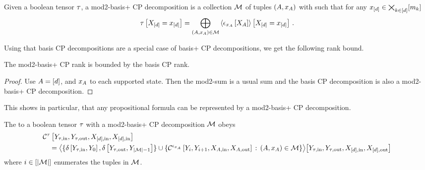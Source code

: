 \begin{definition}
    Given a boolean tensor $\tau$, a mod2-basis+ CP decomposition is a collection $\mathcal{M}$ of tuples $(A,x_{A})$ with such that for any $x_{[d]}\in\bigtimes_{k\in[d]}[m_{k}]$
    \begin{align*}
        \tau\left[X_{[d]}=x_{[d]}\right]
        = \bigoplus_{(A,x_{A})\in\mathcal{M}} \left\langle \epsilon_{x_{A}}\left[X_{A}\right]\right\rangle \left[ X_{[d]}=x_{[d]} \right] \, .
    \end{align*}
\end{definition}

Using that basis CP decompositions are a special case of basis+ CP decompositions, we get the following rank bound.

\begin{lemma}
    The mod2-basis+ CP rank is bounded by the basis CP rank.
\end{lemma}
\begin{proof}
    Use $A=[d]$, and $x_{A}$ to each supported state.
    Then the mod2-sum is a usual sum and the basis CP decomposition is also a mod2-basis+ CP decomposition.
\end{proof}

This shows in particular, that any propositional formula can be represented by a mod2-basis+ CP decomposition.

\begin{lemma}
    The \computationCircuit{} to a boolean tensor $\tau$ with a mod2-basis+ CP decomposition $\mathcal{M}$ obeys
    \begin{align*}
        &\mathcal{C}^{\tau}\left[
            Y_{\tau,\mathrm{in}},Y_{\tau,\mathrm{out}},X_{[d],\mathrm{in}},X_{[d],\mathrm{in}}
        \right] \\
        & \quad =
        \big\langle 
            \{\delta\left[Y_{\tau,\mathrm{in}},Y_{0}\right],\delta\left[Y_{\tau,\mathrm{out}},Y_{\left|\mathcal{M}\right|-1}\right]\} \cup
            \{\mathcal{C}^{\epsilon_{x_{A}}}\left[
                Y_{i}, Y_{i+1},
                X_{A,\mathrm{in}},X_{A,\mathrm{out}}\right] \,:\, (A,x_{A})\in\mathcal{M}\}
         \big\rangle \big[ Y_{\tau,\mathrm{in}},Y_{\tau,\mathrm{out}},X_{[d],\mathrm{in}},X_{[d],\mathrm{out}} \big]
    \end{align*}
    where $i\in[\left|\mathcal{M}\right|]$ enumerates the tuples in $\mathcal{M}$.
\end{lemma}

